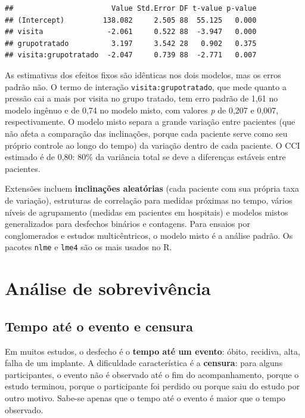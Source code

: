 \documentclass[
]{book}
\newenvironment{Shaded}{\begin{snugshade}}{\end{snugshade}}
\newcommand{\DecValTok}[1]{\textcolor[rgb]{0.00,0.00,0.81}{#1}}
\newcommand{\FunctionTok}[1]{\textcolor[rgb]{0.13,0.29,0.53}{\textbf{#1}}}
\newcommand{\NormalTok}[1]{#1}
\newcommand{\SpecialCharTok}[1]{\textcolor[rgb]{0.81,0.36,0.00}{\textbf{#1}}}
\begin{document}
\begin{Shaded}
\end{Shaded}

\begin{verbatim}
##                       Value Std.Error DF t-value p-value
## (Intercept)         138.082     2.505 88  55.125   0.000
## visita               -2.061     0.522 88  -3.947   0.000
## grupotratado          3.197     3.542 28   0.902   0.375
## visita:grupotratado  -2.047     0.739 88  -2.771   0.007
\end{verbatim}

As estimativas dos efeitos fixos são idênticas nos dois modelos, mas os erros padrão não. O termo de interação \texttt{visita:grupotratado}, que mede quanto a pressão cai a mais por visita no grupo tratado, tem erro padrão de 1,61 no modelo ingênuo e de 0,74 no modelo misto, com valores \emph{p} de 0,207 e 0,007, respectivamente. O modelo misto separa a grande variação entre pacientes (que não afeta a comparação das inclinações, porque cada paciente serve como seu próprio controle ao longo do tempo) da variação dentro de cada paciente. O CCI estimado é de 0,80: 80\% da variância total se deve a diferenças estáveis entre pacientes.

Extensões incluem \textbf{inclinações aleatórias} (cada paciente com sua própria taxa de variação), estruturas de correlação para medidas próximas no tempo, vários níveis de agrupamento (medidas em pacientes em hospitais) e modelos mistos generalizados para desfechos binários e contagens. Para ensaios por conglomerados e estudos multicêntricos, o modelo misto é a análise padrão. Os pacotes \texttt{nlme} e \texttt{lme4} são os mais usados no R.

\section{Análise de sobrevivência}\label{anuxe1lise-de-sobrevivuxeancia}

\subsection{Tempo até o evento e censura}\label{tempo-atuxe9-o-evento-e-censura}

Em muitos estudos, o desfecho é o \textbf{tempo até um evento}: óbito, recidiva, alta, falha de um implante. A dificuldade característica é a \textbf{censura}: para alguns participantes, o evento não é observado até o fim do acompanhamento, porque o estudo terminou, porque o participante foi perdido ou porque saiu do estudo por outro motivo. Sabe-se apenas que o tempo até o evento é maior que o tempo observado.
\end{document}
